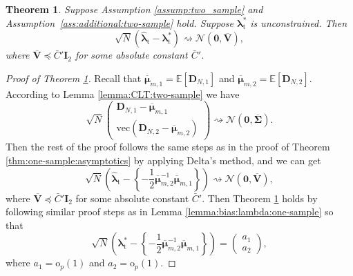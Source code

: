 \documentclass[12pt,letterpaper]{article}
\newtheorem{theorem}{Theorem}[section]
\begin{document}
\begin{theorem}\label{thm:CLT:two-sample}
Suppose Assumption \ref{assump:two_sample} and Assumption~\ref{ass:additional:two-sample} hold. Suppose $\boldsymbol{\lambda}_{\mathrm{t}}^*$ is unconstrained. Then 
$$\sqrt{N}\left(\hat{\boldsymbol{\lambda}}_{\mathrm{t}}-\boldsymbol{\lambda}_{\mathrm{t}}^*\right)\rightsquigarrow\mathcal{N}(\mathbf{0},\overline{\mathbf{V}}),$$ 
where $\overline{\mathbf{V}}\preceq\bar{C}'\mathbf{I}_2$ for some absolute constant $\bar{C}'$.   
\end{theorem}
\begin{proof}[Proof of Theorem \ref{thm:CLT:two-sample}]
Recall that $\overline{\boldsymbol{\mu}}_{m,1}=\mathbb{E}[\mathbf{D}_{N,1}]$ and $\overline{\boldsymbol{\mu}}_{m,2}=\mathbb{E}[\mathbf{D}_{N,2}]$. According to Lemma \ref{lemma:CLT:two-sample} we have  
$$\sqrt{N}\begin{pmatrix}
\mathbf{D}_{N,1}-\overline{\boldsymbol{\mu}}_{m,1}\\
\mathrm{vec}(\mathbf{D}_{N,2}-\overline{\boldsymbol{\mu}}_{m,2})
\end{pmatrix}\rightsquigarrow\mathcal{N}\left(\mathbf{0},\overline{\boldsymbol{\Sigma}}\right).$$
Then the rest of the proof follows the same steps as in the proof of Theorem \ref{thm:one-sample:asymptotics} by applying Delta's method, and we can get 
$$\sqrt{N}\left(\hat{\boldsymbol{\lambda}}_{\mathrm{t}}-\left\{-\frac{1}{2}\overline{\boldsymbol{\mu}}_{m,2}^{-1}\overline{\boldsymbol{\mu}}_{m,1}\right\}\right)\rightsquigarrow\mathcal{N}(\mathbf{0},\overline{\mathbf{V}}),$$ 
where $\overline{\mathbf{V}}\preceq\bar{C}'\mathbf{I}_2$ for some absolute constant $\bar{C}'$. Then Theorem \ref{thm:CLT:two-sample} holds by following similar proof steps as in Lemma \ref{lemma:bias:lambda:one-sample} so that 
$$\sqrt{N}\left(\boldsymbol{\lambda}_{\mathrm{t}}^*-\left\{-\frac{1}{2}\overline{\boldsymbol{\mu}}_{m,2}^{-1}\overline{\boldsymbol{\mu}}_{m,1}\right\}\right)=\begin{pmatrix}
    a_1\\
    a_2
\end{pmatrix},$$
where $a_1=\mathrm{o}_p(1)$ and $a_2=\mathrm{o}_p(1)$. 
\end{proof}
\end{document}
